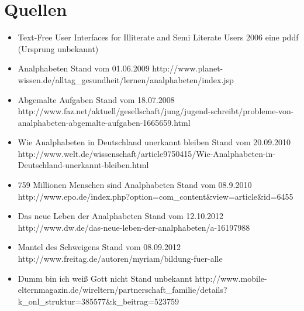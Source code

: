 \newpage 


\thispagestyle{empty}


 \section*{Quellen}



\begin{itemize}

  \item {}
					{Text-Free User Interfaces for Illiterate and Semi Literate Users}
										{2006}
										{eine pddf (Ursprung unbekannt)}


	\item {}
										{Analphabeten}
										{Stand vom 01.06.2009}
										{http://www.planet-wissen.de/alltag_gesundheit/lernen/analphabeten/index.jsp}
										

	\item {}
										{Abgemalte Aufgaben}
										{Stand vom 18.07.2008}
										{http://www.faz.net/aktuell/gesellschaft/jung/jugend-schreibt/probleme-von-analphabeten-abgemalte-aufgaben-1665659.html}									

	\item {}
										{Wie Analphabeten in Deutschland unerkannt bleiben}
										{Stand vom 20.09.2010}
										{http://www.welt.de/wissenschaft/article9750415/Wie-Analphabeten-in-Deutschland-unerkannt-bleiben.html}	

	\item {}
										{759 Millionen Menschen sind Analphabeten}
										{Stand vom 08.9.2010}
										{http://www.epo.de/index.php?option=com_content&view=article&id=6455}										

	\item {}
										{Das neue Leben der Analphabeten }
										{Stand vom 12.10.2012}
										{http://www.dw.de/das-neue-leben-der-analphabeten/a-16197988}										

	\item {}
										{Mantel des Schweigens}
										{Stand vom 08.09.2012}
										{http://www.freitag.de/autoren/myriam/bildung-fuer-alle}										

	\item {}
										{Dumm bin ich weiß Gott nicht}
										{Stand unbekannt}
										{http://www.mobile-elternmagazin.de/wireltern/partnerschaft_familie/details?k_onl_struktur=385577&k_beitrag=523759}			


\end{itemize}

